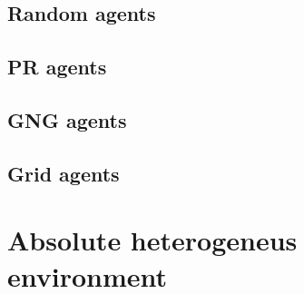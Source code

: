 \subsection{Random agents}                                                   

\subsection{PR agents}

\subsection{GNG agents}

\subsection{Grid agents}            

\section{Absolute heterogeneus environment}

